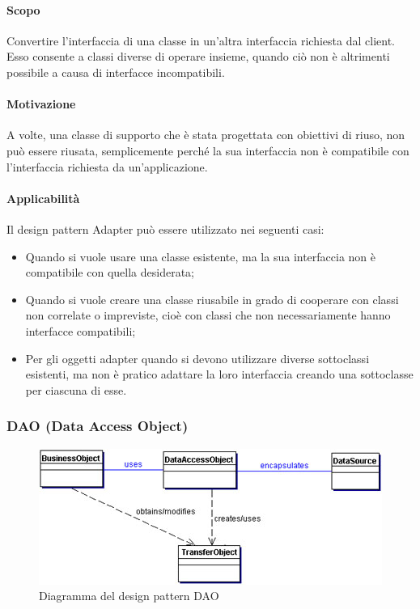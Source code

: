 \paragraph{Scopo\\}
Convertire l'interfaccia di una classe in un'altra interfaccia richiesta dal client. Esso consente a classi diverse di operare insieme, quando ciò non è altrimenti possibile a causa di interfacce incompatibili.

\paragraph{Motivazione\\}
A volte, una classe di supporto che è stata progettata con obiettivi di riuso, non può essere riusata, semplicemente perché la sua interfaccia non è compatibile con l'interfaccia richiesta da un'applicazione.

\paragraph{Applicabilità\\}
Il design pattern\glossario{} Adapter può essere utilizzato nei seguenti casi:
\begin{itemize}
\item Quando si vuole usare una classe esistente, ma la sua interfaccia non è compatibile con quella desiderata;
\item Quando si vuole creare una classe riusabile in grado di cooperare con classi non correlate o impreviste, cioè con classi che non necessariamente hanno interfacce compatibili;
\item Per gli oggetti adapter quando si devono utilizzare diverse sottoclassi esistenti, ma non è pratico adattare la loro interfaccia creando una sottoclasse per ciascuna di esse.
\end{itemize}
\pagebreak

\subsubsection{DAO (Data Access Object)}
\label{DPDAO}
\begin{figure} [!h]
	\centering
	\includegraphics[width=0.7\linewidth]{./Content/Immagini/DAO.jpg}
	\caption{Diagramma del design pattern DAO}
	\label{figDao}
\end{figure}

